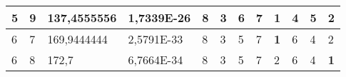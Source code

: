 \documentclass[conference]{IEEEtran}
\begin{document}
\begin{table*}[]
\begin{tabular}{|llll|llllllll|}
\multicolumn{1}{|l|}{5}                                                              & \multicolumn{1}{l|}{9}                                                                 & \multicolumn{1}{l|}{137,4555556}                                                           & 1,7339E-26                              & \multicolumn{1}{l|}{8}                                                           & \multicolumn{1}{l|}{3}                                                           & \multicolumn{1}{l|}{6}                                                           & \multicolumn{1}{l|}{7}                                                           & \multicolumn{1}{l|}{\textbf{1}}                                                  & \multicolumn{1}{l|}{4}                                                           & \multicolumn{1}{l|}{5}                                                           & 2                                   \\ \hline
\multicolumn{1}{|l|}{6}                                                              & \multicolumn{1}{l|}{7}                                                                 & \multicolumn{1}{l|}{169,9444444}                                                           & 2,5791E-33                              & \multicolumn{1}{l|}{8}                                                           & \multicolumn{1}{l|}{3}                                                           & \multicolumn{1}{l|}{5}                                                           & \multicolumn{1}{l|}{7}                                                           & \multicolumn{1}{l|}{\textbf{1}}                                                  & \multicolumn{1}{l|}{6}                                                           & \multicolumn{1}{l|}{4}                                                           & 2                                   \\ \hline
\multicolumn{1}{|l|}{6}                                                              & \multicolumn{1}{l|}{8}                                                                 & \multicolumn{1}{l|}{172,7}                                                                 & 6,7664E-34                              & \multicolumn{1}{l|}{8}                                                           & \multicolumn{1}{l|}{3}                                                           & \multicolumn{1}{l|}{5}                                                           & \multicolumn{1}{l|}{7}                                                           & \multicolumn{1}{l|}{2}                                                           & \multicolumn{1}{l|}{6}                                                           & \multicolumn{1}{l|}{4}                                                           & \textbf{1}                          \\ \hline

\end{tabular}
\end{table*}
\end{document}
